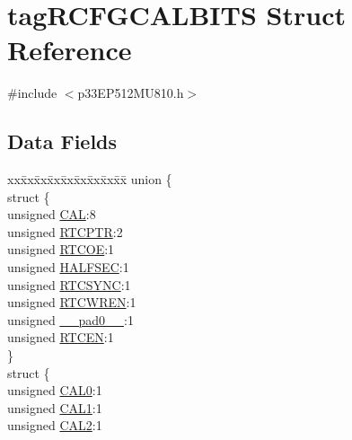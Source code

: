 \hypertarget{structtag_r_c_f_g_c_a_l_b_i_t_s}{}\section{tag\+R\+C\+F\+G\+C\+A\+L\+B\+I\+TS Struct Reference}
\label{structtag_r_c_f_g_c_a_l_b_i_t_s}


{\ttfamily \#include $<$p33\+E\+P512\+M\+U810.\+h$>$}

\subsection*{Data Fields}
\begin{DoxyCompactItemize}
\item 
\begin{tabbing}
xx\=xx\=xx\=xx\=xx\=xx\=xx\=xx\=xx\=\kill
union \{\\
\>struct \{\\
\>\>unsigned \hyperlink{structtag_r_c_f_g_c_a_l_b_i_t_s_aaf16b8231e5f7fc712ac8ff32d2a68d2}{CAL}:8\\
\>\>unsigned \hyperlink{structtag_r_c_f_g_c_a_l_b_i_t_s_aadae451cfeed4b73442fa8b805c3c96e}{RTCPTR}:2\\
\>\>unsigned \hyperlink{structtag_r_c_f_g_c_a_l_b_i_t_s_a88a2d551facc0d7b81296097b7edd020}{RTCOE}:1\\
\>\>unsigned \hyperlink{structtag_r_c_f_g_c_a_l_b_i_t_s_a8596ee9739a71562243fdd5cc9b4c8e0}{HALFSEC}:1\\
\>\>unsigned \hyperlink{structtag_r_c_f_g_c_a_l_b_i_t_s_a94d66bcf6419aee4948bc050e080cc5a}{RTCSYNC}:1\\
\>\>unsigned \hyperlink{structtag_r_c_f_g_c_a_l_b_i_t_s_a5da8cad801eaaf11107a50b5ec8013c1}{RTCWREN}:1\\
\>\>unsigned \hyperlink{structtag_r_c_f_g_c_a_l_b_i_t_s_adf71f3d8410c1f1dbbc96680a92c49af}{\_\_pad0\_\_}:1\\
\>\>unsigned \hyperlink{structtag_r_c_f_g_c_a_l_b_i_t_s_a06f0b05ed2514904389872ebc2368917}{RTCEN}:1\\
\>\} \\
\>struct \{\\
\>\>unsigned \hyperlink{structtag_r_c_f_g_c_a_l_b_i_t_s_ac009856754be17f3d15d6aaa8d9e5b44}{CAL0}:1\\
\>\>unsigned \hyperlink{structtag_r_c_f_g_c_a_l_b_i_t_s_aa25df969a4df1d9ea8d4eaafd3af127b}{CAL1}:1\\
\>\>unsigned \hyperlink{structtag_r_c_f_g_c_a_l_b_i_t_s_a9a21fa663facef78a40a1bc3a1484589}{CAL2}:1\\

\end{tabbing}
\end{DoxyCompactItemize}
